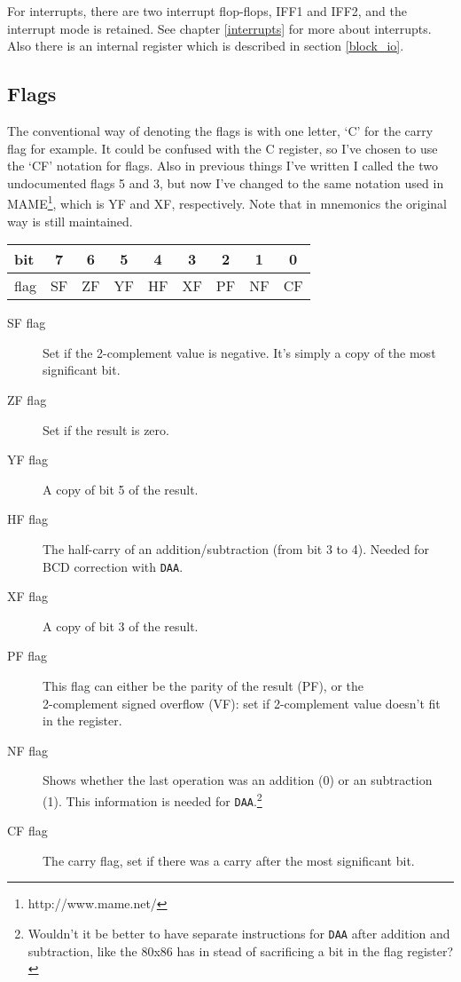 \documentclass[twoside,openright,a4paper]{book}
\newcommand{\instrt}{\rule{0pt}{2.7ex}}
\newcommand{\instrb}{\rule[-1.7ex]{0pt}{0pt}}
\begin{document}
For interrupts, there are two interrupt flop-flops, IFF1 and IFF2, and the interrupt mode is retained. See chapter \ref{interrupts} for more about interrupts. Also there is an internal register which is described in section \ref{block_io}.


\subsection{Flags}
\label{flags}

The conventional way of denoting the flags is with one letter, `C' for the carry flag for example. It could be confused with the C register, so I've chosen to use the `CF' notation for flags. Also in previous things I've written I called the two undocumented flags 5 and 3, but now I've changed to the same notation used in MAME\footnote{http://www.mame.net/}, which is YF and XF, respectively. Note that in mnemonics the original way is still maintained.

\begin{tabular}{|l|c|c|c|c|c|c|c|c|} 
	\hline
	bit & 7 & 6 & 5 & 4 & 3 & 2 & 1 & 0 \instrt\instrb \\
	\hline
	flag & SF & ZF & YF & HF & XF & PF & NF & CF \instrt\instrb \\ 
	\hline
\end{tabular}

\begin{description}

	\item[SF flag]
	Set if the 2-complement value is negative. It's simply a copy of the most significant bit.

	\item[ZF flag]
	Set if the result is zero.

	\item[YF flag]
	A copy of bit 5 of the result.

	\item[HF flag]
	The half-carry of an addition/subtraction (from bit 3 to 4). Needed for BCD correction with {\tt DAA}.

	\item[XF flag]
	A copy of bit 3 of the result.

	\item[PF flag]
	This flag can either be the parity of the result (PF), or the \\ 2-complement signed overflow (VF): set if 2-complement value doesn't fit in the register.

	\item[NF flag]
	Shows whether the last operation was an addition (0) or an subtraction (1). This information is needed for {\tt DAA}.\footnote{Wouldn't it be better to have separate instructions for {\tt DAA} after addition and subtraction, like the 80x86 has in stead of sacrificing a bit in the flag register?}

	\item[CF flag]
	The carry flag, set if there was a carry after the most significant bit.

\end{description}
\end{document}
